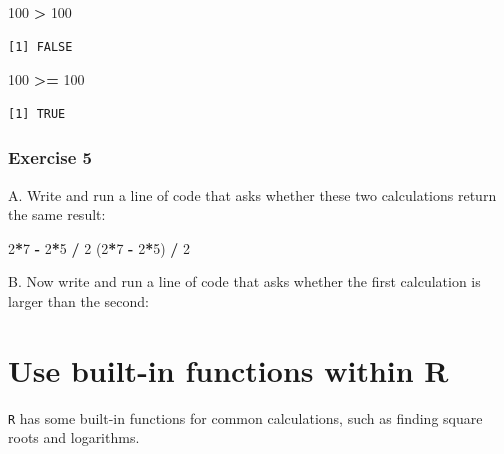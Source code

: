 \documentclass[
]{book}
\newenvironment{Shaded}{\begin{snugshade}}{\end{snugshade}}
\newcommand{\DecValTok}[1]{\textcolor[rgb]{0.00,0.00,0.81}{#1}}
\newcommand{\NormalTok}[1]{#1}
\newcommand{\OperatorTok}[1]{\textcolor[rgb]{0.81,0.36,0.00}{\textbf{#1}}}
\newcommand{\StringTok}[1]{\textcolor[rgb]{0.31,0.60,0.02}{#1}}
\begin{document}
\begin{Shaded}
\begin{Highlighting}[]
\DecValTok{100} \OperatorTok{>}\StringTok{ }\DecValTok{100}
\end{Highlighting}
\end{Shaded}

\begin{verbatim}
[1] FALSE
\end{verbatim}

\begin{Shaded}
\begin{Highlighting}[]
\DecValTok{100} \OperatorTok{>=}\StringTok{ }\DecValTok{100}
\end{Highlighting}
\end{Shaded}

\begin{verbatim}
[1] TRUE
\end{verbatim}

\hypertarget{exercise-5}{%
\subsubsection*{Exercise 5}\label{exercise-5}}

A. Write and run a line of code that asks whether these two calculations return the same result:

\begin{Shaded}
\begin{Highlighting}[]
\DecValTok{2}\OperatorTok{*}\DecValTok{7} \OperatorTok{-}\StringTok{ }\DecValTok{2}\OperatorTok{*}\DecValTok{5} \OperatorTok{/}\StringTok{ }\DecValTok{2}
\NormalTok{(}\DecValTok{2}\OperatorTok{*}\DecValTok{7} \OperatorTok{-}\StringTok{ }\DecValTok{2}\OperatorTok{*}\DecValTok{5}\NormalTok{) }\OperatorTok{/}\StringTok{ }\DecValTok{2}
\end{Highlighting}
\end{Shaded}

B. Now write and run a line of code that asks whether the first calculation is larger than the second:

\hypertarget{use-built-in-functions-within-r}{%
\section{Use built-in functions within R}\label{use-built-in-functions-within-r}}

\texttt{R} has some built-in functions for common calculations, such as finding square roots and logarithms.
\end{document}
